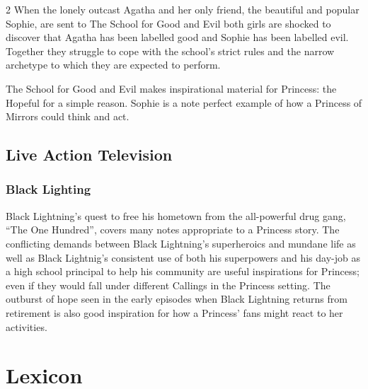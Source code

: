 \begin{multicols}{2}
When the lonely outcast Agatha and her only friend, the beautiful and popular Sophie, are sent to The School for Good and Evil both girls are shocked to discover that Agatha has been labelled good and Sophie has been labelled evil. Together they struggle to cope with the school's strict rules and the narrow archetype to which they are expected to perform. 

The School for Good and Evil makes inspirational material for Princess: the Hopeful for a simple reason. Sophie is a note perfect example of how a Princess of Mirrors could think and act.

\subsection*{Live Action Television}

\subsubsection*{Black Lighting}

Black Lightning's quest to free his hometown from the all-powerful drug gang, \textquotedblleft The One Hundred\textquotedblright, covers many notes appropriate to a Princess story. The conflicting demands between Black Lightning's superheroics and mundane life as well as Black Lightnig's consistent use of both his superpowers and his day-job as a high school principal to help his community are useful inspirations for Princess; even if they would fall under different Callings in the Princess setting. The outburst of hope seen in the early episodes when Black Lightning returns from retirement is also good inspiration for how a Princess' fans might react to her activities.

\section*{Lexicon}
\label{sec:lexicon}


\end{multicols}
